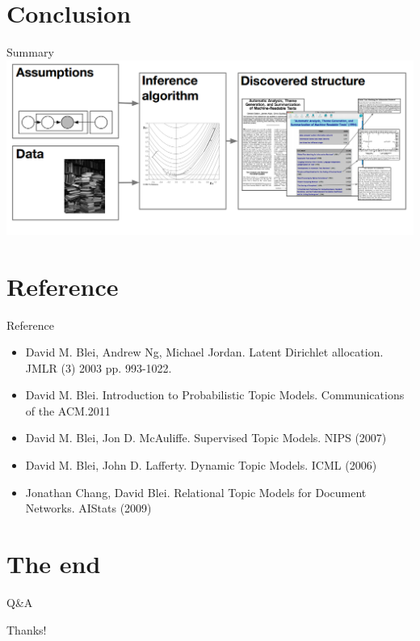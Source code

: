 \documentclass[hyperref={unicode}]{beamer}
\begin{document}
\begin{CJK}{UTF8}{gkai}
\section{Conclusion}
\begin{frame}{Summary}
  \includegraphics[scale=0.4]{summary}
\end{frame}

\section{Reference}
\begin{frame}{Reference}
\begin{itemize}
\item David M. Blei, Andrew Ng, Michael Jordan. Latent Dirichlet allocation. JMLR (3) 2003 pp. 993-1022.
\item   David M. Blei. Introduction to Probabilistic Topic Models. Communications of the ACM.2011
\item David M. Blei, Jon D. McAuliffe. Supervised Topic Models. NIPS (2007)
\item David M. Blei, John D. Lafferty. Dynamic Topic Models. ICML (2006)
\item Jonathan Chang, David Blei. Relational Topic Models for Document Networks. AIStats (2009)
\end{itemize}
\end{frame}

\section{The end}
\begin{frame}{Q\&A}
  \begin{center}
    \LARGE{\alert{Thanks!}}
  \end{center}
\end{frame}
\end{CJK}
\end{document}
